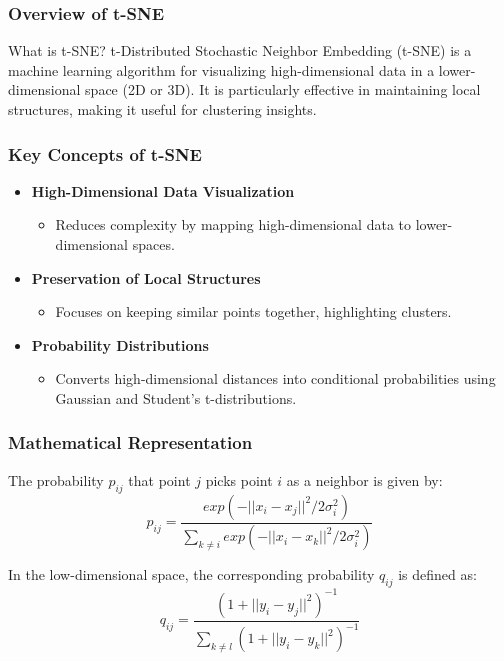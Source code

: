 \documentclass[aspectratio=169]{beamer}
\begin{document}
\begin{frame}[fragile]
  \frametitle{Overview of t-SNE}
  \begin{block}{What is t-SNE?}
    t-Distributed Stochastic Neighbor Embedding (t-SNE) is a machine learning algorithm for visualizing high-dimensional data in a lower-dimensional space (2D or 3D). It is particularly effective in maintaining local structures, making it useful for clustering insights.
  \end{block}
\end{frame}

\begin{frame}[fragile]
  \frametitle{Key Concepts of t-SNE}
  \begin{itemize}
    \item \textbf{High-Dimensional Data Visualization}
      \begin{itemize}
        \item Reduces complexity by mapping high-dimensional data to lower-dimensional spaces.
      \end{itemize}
    \item \textbf{Preservation of Local Structures}
      \begin{itemize}
        \item Focuses on keeping similar points together, highlighting clusters.
      \end{itemize}
    \item \textbf{Probability Distributions}
      \begin{itemize}
        \item Converts high-dimensional distances into conditional probabilities using Gaussian and Student's t-distributions.
      \end{itemize}
  \end{itemize}
\end{frame}

\begin{frame}[fragile]
  \frametitle{Mathematical Representation}
  The probability \( p_{ij} \) that point \( j \) picks point \( i \) as a neighbor is given by:
  \begin{equation}
    p_{ij} = \frac{exp(-||x_i - x_j||^2/2\sigma_i^2)}{\sum_{k \neq i} exp(-||x_i - x_k||^2/2\sigma_i^2)}
  \end{equation}
  
  In the low-dimensional space, the corresponding probability \( q_{ij} \) is defined as:
  \begin{equation}
    q_{ij} = \frac{(1 + ||y_i - y_j||^2)^{-1}}{\sum_{k \neq l} (1 + ||y_i - y_k||^2)^{-1}}
  \end{equation}
\end{frame}
\end{document}
